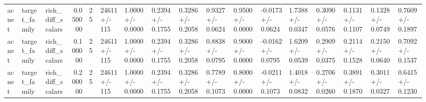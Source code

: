 \begin{longtable}{lllrlllllllllllll}
acnet & target\_family & rich\_diff\_scalars & 0.050000 & 25 & 24611 +/- 115 & 1.0000 +/- 0.0000 & 0.2394 +/- 0.1755 & 0.3286 +/- 0.2058 & 0.9327 +/- 0.0624 & 0.9500 +/- 0.0000 & -0.0173 +/- 0.0624 & 1.7388 +/- 0.0347 & 0.3090 +/- 0.0576 & 0.1131 +/- 0.1107 & 0.1328 +/- 0.0749 & 0.7609 +/- 0.1897 \\
acnet & target\_family & rich\_diff\_scalars & 0.100000 & 25 & 24611 +/- 115 & 1.0000 +/- 0.0000 & 0.2394 +/- 0.1755 & 0.3286 +/- 0.2058 & 0.8838 +/- 0.0795 & 0.9000 +/- 0.0000 & -0.0162 +/- 0.0795 & 1.6209 +/- 0.0539 & 0.2909 +/- 0.0375 & 0.2114 +/- 0.1528 & 0.2150 +/- 0.0640 & 0.7092 +/- 0.1537 \\
acnet & target\_family & rich\_diff\_scalars & 0.200000 & 25 & 24611 +/- 115 & 1.0000 +/- 0.0000 & 0.2394 +/- 0.1755 & 0.3286 +/- 0.2058 & 0.7789 +/- 0.1073 & 0.8000 +/- 0.0000 & -0.0211 +/- 0.1073 & 1.4018 +/- 0.0832 & 0.2706 +/- 0.0260 & 0.3891 +/- 0.1870 & 0.3011 +/- 0.0327 & 0.6415 +/- 0.1230 \\
\end{longtable}
